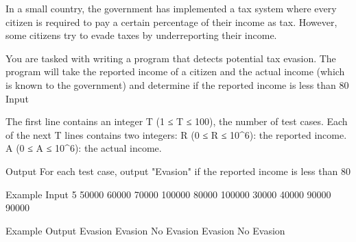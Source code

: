 
In a small country, the government has implemented a tax system where every citizen is required to pay a certain percentage of their income as tax. However, some citizens try to evade taxes by underreporting their income.

You are tasked with writing a program that detects potential tax evasion. The program will take the reported income of a citizen and the actual income (which is known to the government) and determine if the reported income is less than 80%
Input

    The first line contains an integer T (1 ≤ T ≤ 100), the number of test cases.
    Each of the next T lines contains two integers:
        R (0 ≤ R ≤ 10^6): the reported income.
        A (0 ≤ A ≤ 10^6): the actual income.

Output
For each test case, output "Evasion" if the reported income is less than 80%

Example Input
5
50000 60000
70000 100000
80000 100000
30000 40000
90000 90000

Example Output
Evasion
Evasion
No Evasion
Evasion
No Evasion